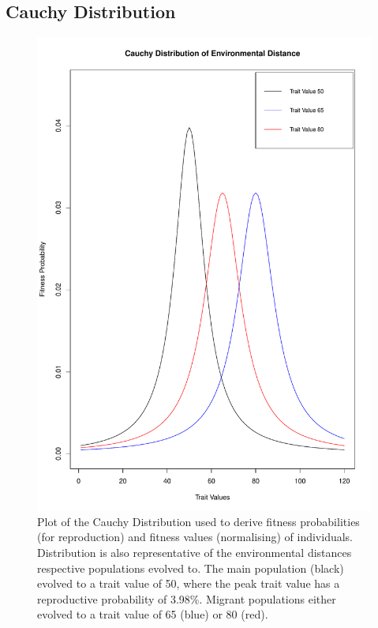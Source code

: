 \subsection{Cauchy Distribution}
\begin{figure}
    \begin{center}
        \includegraphics[scale=0.2]{../Results/Cauchy_Distribution.pdf}
    \end{center}
    \caption{Plot of the Cauchy Distribution used to derive fitness probabilities (for reproduction) and fitness values (normalising) of individuals. Distribution is also representative of the environmental distances respective populations evolved to. The main population (black) evolved to a trait value of 50, where the peak trait value has a reproductive probability of 3.98\%. Migrant populations either evolved to a trait value of 65 (blue) or 80 (red).}
    \label{fig:Cauchy Distribution}
\end{figure}

